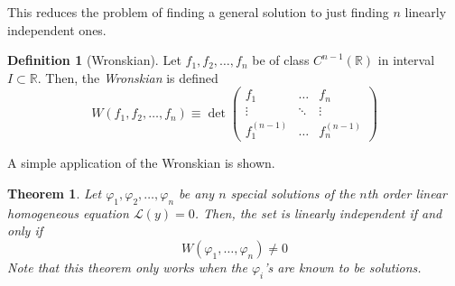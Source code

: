 \documentclass{article}
\newtheorem{theorem}{Theorem}[section]
\theoremstyle{remark}
\theoremstyle{definition}
\newtheorem{definition}{Definition}[section]
\begin{document}
    This reduces the problem of finding a general solution to just finding $n$ linearly independent ones. 

    \begin{definition}[Wronskian]
    Let $f_1, f_2, \ldots, f_n$ be of class $C^{n-1} (\mathbb{R})$ in interval $I \subset \mathbb{R}$. Then, the \textit{Wronskian} is defined
    \[W(f_1, f_2, \ldots, f_n) \equiv \det{\begin{pmatrix}
    f_1&\ldots&f_n\\
    \vdots&\ddots&\vdots\\
    f_1^{(n-1)}&\ldots&f_n^{(n-1)}
    \end{pmatrix}}\]
    \end{definition}

    A simple application of the Wronskian is shown. 
    \begin{theorem}
    Let $\varphi_1, \varphi_2, \ldots, \varphi_n$ be any $n$ special solutions of the $n$th order linear homogeneous equation $\mathcal{L}(y) = 0$. Then, the set is linearly independent if and only if 
    \[W(\varphi_1, \ldots, \varphi_n) \neq 0\]
    Note that this theorem only works when the $\varphi_i$'s are known to be solutions. 
    \end{theorem}
\end{document}
